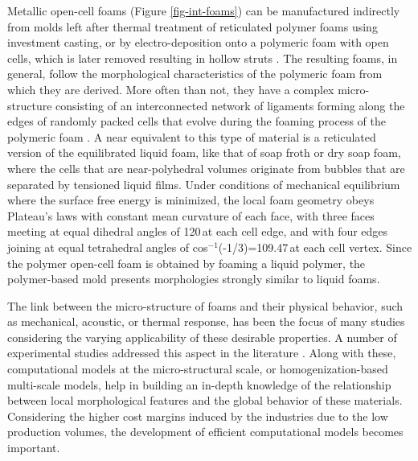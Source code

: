 Metallic open-cell foams (Figure \ref{fig-int-foams}) can be manufactured indirectly from molds left after thermal treatment of reticulated polymer foams using investment casting, or by electro-deposition  onto a polymeric foam with open cells, which is later removed resulting in hollow struts \cite{banhartManufactureCharacterisationApplication2001}. The resulting foams, in general, follow the morphological characteristics of the polymeric foam from which they are derived. More often than not, they have a complex micro-structure consisting of an interconnected network of ligaments forming along the edges of randomly packed cells that evolve during the foaming process of the polymeric foam \cite{jangMicrostructureOpencellFoams2008}. A near equivalent to this type of material is a reticulated version of the equilibrated liquid foam, like that of soap froth or dry soap foam, where the cells that are near-polyhedral volumes originate from bubbles that are separated by tensioned liquid films. Under conditions of mechanical equilibrium where the surface free energy is minimized, the local foam geometry obeys Plateau's laws \cite{plateauStatiqueExperimentaleTheorique1873,kraynikStructureRandomMonodisperse2003} with constant mean curvature of each face, with three faces meeting at equal dihedral angles of 120\degree\,at each cell edge, and with four edges joining at equal tetrahedral angles of cos$ ^{-1} $(-1/3)=109.47\degree\,at each cell vertex. Since the polymer open-cell foam is obtained by foaming a liquid polymer, the polymer-based mold presents morphologies strongly similar to liquid foams. 

The link between the micro-structure of foams and their physical behavior, such as mechanical, acoustic, or thermal response, has been the focus of many studies considering the varying applicability of these desirable properties. A number of experimental studies addressed this aspect in the literature \cite{jangCrushingAluminumOpencell2009,jangCrushingAluminumOpencell2009a,gongCompressiveResponseOpencell2005,hodgeMeasurementModelingCreep2003,jungNanonickelCoatedAluminum2011}. Along with these, computational models at the micro-structural scale, or homogenization-based multi-scale models, help in building an in-depth knowledge of the relationship between local morphological features and the global behavior of these materials. Considering the higher cost margins induced by the industries due to the low production volumes, the development of efficient computational models becomes important. 

